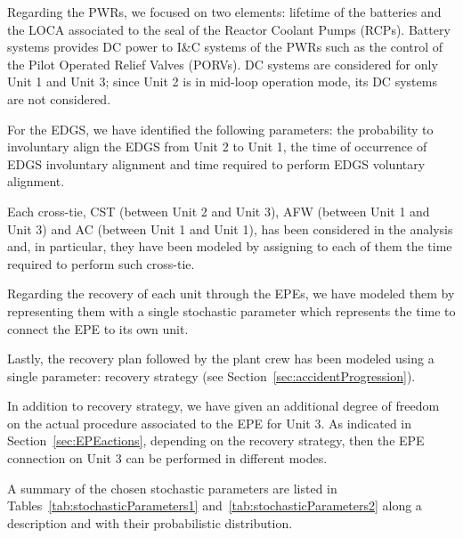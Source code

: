 Regarding the PWRs, we focused on two elements: lifetime of the batteries and the LOCA 
associated to the seal of the Reactor Coolant Pumps (RCPs). Battery systems provides 
DC power to I\&C systems 
of the PWRs such as the control of the Pilot Operated Relief Valves (PORVs).
DC systems are considered for only 
Unit 1 and Unit 3; since Unit 2 is in mid-loop operation mode, its DC systems are not 
considered.

For the EDGS, we have identified the following parameters: the probability to 
involuntary align the EDGS from Unit 2 to Unit 1, the time of occurrence of EDGS
involuntary alignment and time required to perform EDGS voluntary alignment.  

Each cross-tie, CST (between Unit 2 and Unit 3), AFW (between Unit 1 and Unit 3) 
and AC (between Unit 1 and Unit 1), has been considered in the analysis and, in 
particular, they have been modeled by assigning to each of them the time required 
to perform such cross-tie.

Regarding the recovery of each unit through the EPEs, we have modeled them by 
representing them with a single stochastic parameter which represents the
time to connect the EPE to its own unit.

Lastly, the recovery plan followed by the plant crew has been modeled using a single
parameter: recovery strategy (see Section~\ref{sec:accidentProgression}).

In addition to recovery strategy, we have given an additional degree of freedom on 
the actual procedure associated to the EPE for Unit 3. 
As indicated in Section~\ref{sec:EPEactions}, depending on the  recovery strategy, 
then the EPE connection on Unit 3 can be performed in different modes. 

A summary of the chosen stochastic parameters are listed in Tables~\ref{tab:stochasticParameters1} 
and~\ref{tab:stochasticParameters2}
along a description and with their probabilistic distribution.

